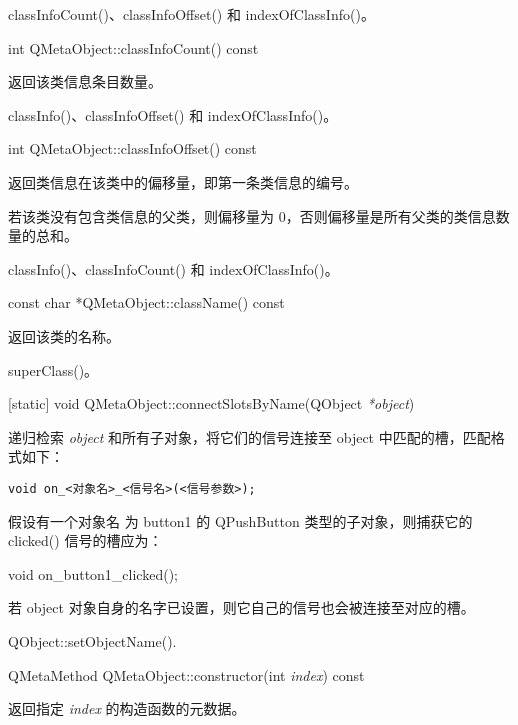 
\begin{seeAlso}
classInfoCount()、classInfoOffset() 和 indexOfClassInfo()。
\end{seeAlso}

int QMetaObject::classInfoCount() const

返回该类信息条目数量。

\begin{seeAlso}
classInfo()、classInfoOffset() 和 indexOfClassInfo()。
\end{seeAlso}

int QMetaObject::classInfoOffset() const

返回类信息在该类中的偏移量，即第一条类信息的编号。

若该类没有包含类信息的父类，则偏移量为 0，否则偏移量是所有父类的类信息数量的总和。

\begin{seeAlso}
classInfo()、classInfoCount() 和 indexOfClassInfo()。
\end{seeAlso}

const char *QMetaObject::className() const

返回该类的名称。

\begin{seeAlso}
superClass()。
\end{seeAlso}

[static] void QMetaObject::connectSlotsByName(QObject \emph{*object})

递归检索 \emph{object} 和所有子对象，将它们的信号连接至 object 中匹配的槽，匹配格式如下：

\begin{lstlisting}
void on_<对象名>_<信号名>(<信号参数>);
\end{lstlisting}

假设有一个对象名 为 button1 的 QPushButton 类型的子对象，则捕获它的 clicked() 信号的槽应为：

\begin{cppcode}
void on_button1_clicked();
\end{cppcode}

若 object 对象自身的名字已设置，则它自己的信号也会被连接至对应的槽。

\begin{seeAlso}
QObject::setObjectName().
\end{seeAlso}

QMetaMethod QMetaObject::constructor(int \emph{index}) const

返回指定 \emph{index} 的构造函数的元数据。

